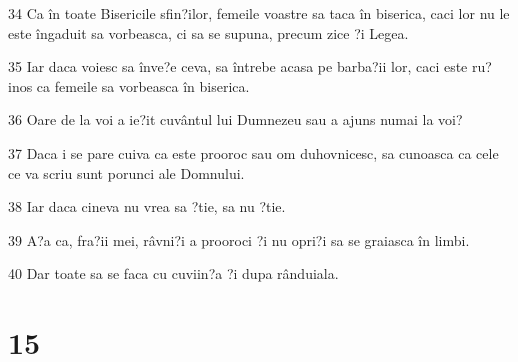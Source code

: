 \par 34 Ca în toate Bisericile sfin?ilor, femeile voastre sa taca în biserica, caci lor nu le este îngaduit sa vorbeasca, ci sa se supuna, precum zice ?i Legea.
\par 35 Iar daca voiesc sa înve?e ceva, sa întrebe acasa pe barba?ii lor, caci este ru?inos ca femeile sa vorbeasca în biserica.
\par 36 Oare de la voi a ie?it cuvântul lui Dumnezeu sau a ajuns numai la voi?
\par 37 Daca i se pare cuiva ca este prooroc sau om duhovnicesc, sa cunoasca ca cele ce va scriu sunt porunci ale Domnului.
\par 38 Iar daca cineva nu vrea sa ?tie, sa nu ?tie.
\par 39 A?a ca, fra?ii mei, râvni?i a prooroci ?i nu opri?i sa se graiasca în limbi.
\par 40 Dar toate sa se faca cu cuviin?a ?i dupa rânduiala.

\chapter{15}

